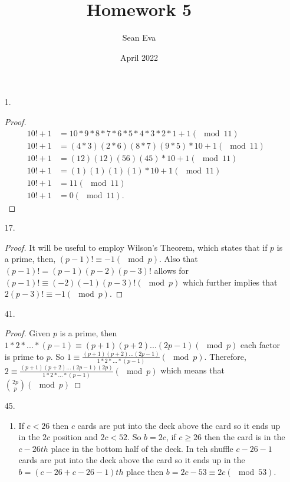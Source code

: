 \documentclass{article}
\title{Homework 5}
\author{Sean Eva}
\date{April 2022}
\theoremstyle{definition}
\begin{document}
\maketitle

\begin{enumerate}
    \item [1. ]
    
    \begin{proof}
    \begin{align*}
        10! + 1 &= 10 * 9 * 8 * 7 * 6 * 5 * 4 * 3 * 2 * 1 + 1 (\mod 11)\\
        10! + 1 &= (4 * 3)(2 * 6)(8 * 7)(9 * 5) * 10 + 1(\mod 11)\\
        10! + 1 &= (12)(12)(56)(45) * 10 +1 (\mod 11)\\
        10! + 1 &= (1)(1)(1)(1)*10+1(\mod11)\\
        10! + 1 &= 11(\mod 11)\\
        10! + 1 &= 0 (\mod 11).
    \end{align*}
    \end{proof}
    
     \item [17. ]
    
    \begin{proof}
    It will be useful to employ Wilson's Theorem, which states that if $p$ is a prime, then, $(p-1)! \equiv -1(\mod p).$ Also that $(p-1)! = (p-1)(p-2)(p-3)!$ allows for $(p-1)! \equiv (-2)(-1)(p-3)!(\mod p)$ which further implies that $2(p-3)! \equiv -1 (\mod p).$
    \end{proof}
    
     \item [41. ]
    
    \begin{proof}
    Given $p$ is a prime, then $1*2*...*(p-1)\equiv (p+1)(p+2)...(2p-1)(\mod p)$ each factor is prime to $p$. So $1 \equiv \frac{(p+1)(p+2)...(2p-1)}{1*2*...*(p-1)}(\mod p)$. Therefore, $2 \equiv \frac{(p+1)(p+2)...(2p-1)(2p)}{1*2*...*(p-1)}(\mod p)$ which means that $\binom{2p}{p}(\mod p)$
    \end{proof}
    
     \item [45. ]
    
    \begin{enumerate}
        \item 
        
        If $c < 26$ then $c$ cards are put into the deck above the card so it ends up in the $2c$ position and $2c < 52.$ So $b = 2c$, if $c \geq 26$ then the card is in the $c-26th$ place in the bottom half of the deck. In teh shuffle $c-26-1$ cards are put into the deck above the card so it ends up in the $b = (c-26+c-26-1)th$ place then $b = 2c - 53 \equiv 2c(\mod 53).$
        

\end{enumerate}
\end{enumerate}
\end{document}
